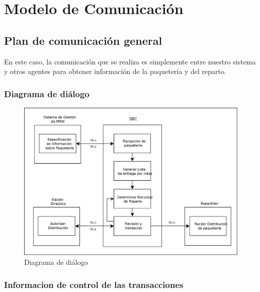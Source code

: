 

\chapter{Modelo de Comunicación}

\section{Plan de comunicación general}

En este caso, la comunicación que se realiza es simplemente entre nuestro sistema y otros agentes para obtener información de la paquetería y del reparto.

\subsection{Diagrama de diálogo}

  \begin{figure}[H]
    \centering
    \includegraphics[scale=0.30]{imaxes/Comunicaciones.png}
    \caption{\label{fig:Comunicaciones}Diagrama de diálogo}
  \end{figure}
  
\subsection{Informacion de control de las transacciones}

